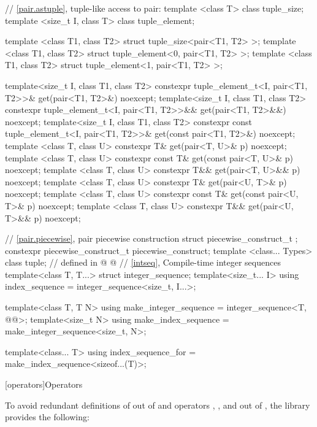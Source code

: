 \begin{codeblock}
{  // \ref{pair.astuple}, tuple-like access to pair:
  template <class T> class tuple_size;
  template <size_t I, class T> class tuple_element;

  template <class T1, class T2> struct tuple_size<pair<T1, T2> >;
  template <class T1, class T2> struct tuple_element<0, pair<T1, T2> >;
  template <class T1, class T2> struct tuple_element<1, pair<T1, T2> >;

  template<size_t I, class T1, class T2>
    constexpr tuple_element_t<I, pair<T1, T2>>&
      get(pair<T1, T2>&) noexcept;
  template<size_t I, class T1, class T2>
    constexpr tuple_element_t<I, pair<T1, T2>>&&
      get(pair<T1, T2>&&) noexcept;
  template<size_t I, class T1, class T2>
    constexpr const tuple_element_t<I, pair<T1, T2>>&
      get(const pair<T1, T2>&) noexcept;
  template <class T, class U>
    constexpr T& get(pair<T, U>& p) noexcept;
  template <class T, class U>
    constexpr const T& get(const pair<T, U>& p) noexcept;
  template <class T, class U>
    constexpr T&& get(pair<T, U>&& p) noexcept;
  template <class T, class U>
    constexpr T& get(pair<U, T>& p) noexcept;
  template <class T, class U>
    constexpr const T& get(const pair<U, T>& p) noexcept;
  template <class T, class U>
    constexpr T&& get(pair<U, T>&& p) noexcept;

  // \ref{pair.piecewise}, pair piecewise construction
  struct piecewise_construct_t { };
  constexpr piecewise_construct_t piecewise_construct{};
  template <class... Types> class tuple;  // defined in 
@
%
%
%
@
  // \ref{intseq}, Compile-time integer sequences
  template<class T, T...> struct integer_sequence;
  template<size_t... I>
    using index_sequence = integer_sequence<size_t, I...>;

  template<class T, T N>
    using make_integer_sequence = integer_sequence<T, @\seebelow{}@>;
  template<size_t N>
    using make_index_sequence = make_integer_sequence<size_t, N>;

  template<class... T>
    using index_sequence_for = make_index_sequence<sizeof...(T)>;
}
\end{codeblock}

[operators]{Operators}

\pnum
To avoid redundant definitions of  out of 
and operators \tcode{>}, \tcode{<=}, and \tcode{>=} out of ,
the library provides the following:

